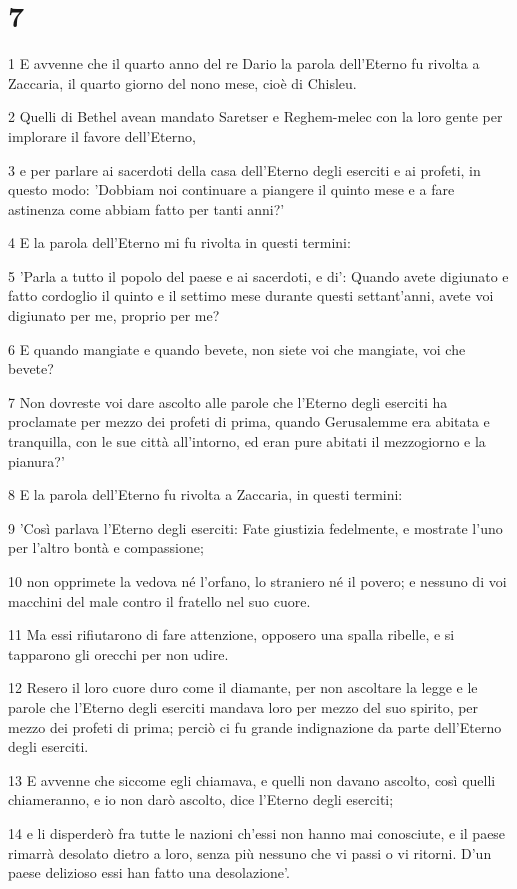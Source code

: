\chapter{7}

\par 1 E avvenne che il quarto anno del re Dario la parola dell'Eterno fu rivolta a Zaccaria, il quarto giorno del nono mese, cioè di Chisleu.
\par 2 Quelli di Bethel avean mandato Saretser e Reghem-melec con la loro gente per implorare il favore dell'Eterno,
\par 3 e per parlare ai sacerdoti della casa dell'Eterno degli eserciti e ai profeti, in questo modo: 'Dobbiam noi continuare a piangere il quinto mese e a fare astinenza come abbiam fatto per tanti anni?'
\par 4 E la parola dell'Eterno mi fu rivolta in questi termini:
\par 5 'Parla a tutto il popolo del paese e ai sacerdoti, e di': Quando avete digiunato e fatto cordoglio il quinto e il settimo mese durante questi settant'anni, avete voi digiunato per me, proprio per me?
\par 6 E quando mangiate e quando bevete, non siete voi che mangiate, voi che bevete?
\par 7 Non dovreste voi dare ascolto alle parole che l'Eterno degli eserciti ha proclamate per mezzo dei profeti di prima, quando Gerusalemme era abitata e tranquilla, con le sue città all'intorno, ed eran pure abitati il mezzogiorno e la pianura?'
\par 8 E la parola dell'Eterno fu rivolta a Zaccaria, in questi termini:
\par 9 'Così parlava l'Eterno degli eserciti: Fate giustizia fedelmente, e mostrate l'uno per l'altro bontà e compassione;
\par 10 non opprimete la vedova né l'orfano, lo straniero né il povero; e nessuno di voi macchini del male contro il fratello nel suo cuore.
\par 11 Ma essi rifiutarono di fare attenzione, opposero una spalla ribelle, e si tapparono gli orecchi per non udire.
\par 12 Resero il loro cuore duro come il diamante, per non ascoltare la legge e le parole che l'Eterno degli eserciti mandava loro per mezzo del suo spirito, per mezzo dei profeti di prima; perciò ci fu grande indignazione da parte dell'Eterno degli eserciti.
\par 13 E avvenne che siccome egli chiamava, e quelli non davano ascolto, così quelli chiameranno, e io non darò ascolto, dice l'Eterno degli eserciti;
\par 14 e li disperderò fra tutte le nazioni ch'essi non hanno mai conosciute, e il paese rimarrà desolato dietro a loro, senza più nessuno che vi passi o vi ritorni. D'un paese delizioso essi han fatto una desolazione'.


